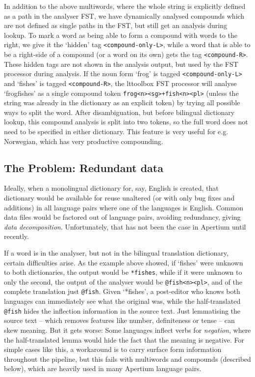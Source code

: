 \documentclass[10pt, a4paper]{article}
\newcommand{\ana}[1]{\texttt{#1}}
\newcommand{\f}[1]{`#1'}
\begin{document}
In addition to the above multiwords, where the whole string is
explicitly defined as a path in the analyser FST, we have dynamically
analysed compounds which are not defined as single paths in the FST,
but still get an analysis during lookup. To mark a word as being able
to form a compound with words to the right, we give it the \f{hidden}
tag \ana{<compound-only-L>}, while a word that is able to be a
right-side of a compound (or a word on its own) gets the tag
\ana{<compound-R>}. These hidden tags are not shown in the analysis
output, but used by the FST processor during analysis. If the noun
form \f{frog} is tagged \ana{<compound-only-L>} and \f{fishes} is
tagged \ana{<compound-R>}, the lttoolbox FST processor will
analyse \f{frogfishes} as a single compound token
\ana{frog<n><sg>+fish<n><pl>} (unless the string was already in the
dictionary as an explicit token) by trying all possible ways to split
the word. After disambiguation, but before bilingual dictionary
lookup, this compound analysis is split into two tokens, so the full
word does not need to be specified in either dictionary. This feature
is very useful for e.g. Norwegian, which has very productive
compounding.

\subsection{The Problem: Redundant data}
\label{sec:problem}

Ideally, when a monolingual dictionary for, say, English is created,
that dictionary would be available for reuse unaltered (or with only
bug fixes and additions) in all language pairs where one of the
languages is English. Common data files would be factored out of
language pairs, avoiding redundancy, giving \emph{data decomposition}.
Unfortunately, that has not been the case in Apertium until recently.

If a word is in the analyser, but not in the bilingual translation
dictionary, certain difficulties arise. As the example above showed,
if \f{fishes} were unknown to both dictionaries, the output would be
\ana{*fishes}, while if it were unknown to only the second, the output
of the analyser would be \ana{@fish<n><pl>}, and of the complete
translation just \ana{@fish}. Given \f{*fishes}, a post-editor who
knows both languages can immediately see what the original was, while
the half-translated \ana{@fish} hides the inflection information in
the source text. Just lemmatising the source text – which removes
features like number, definiteness or tense – can skew meaning. But it
gets worse: Some languages inflect verbs for \emph{negation}, where
the half-translated lemma would hide the fact that the meaning is
negative. For simple cases like this, a workaround is to carry surface
form information throughout the pipeline, but this fails with
multiwords and compounds (described below), which are heavily used in
many Apertium language pairs.
\end{document}
